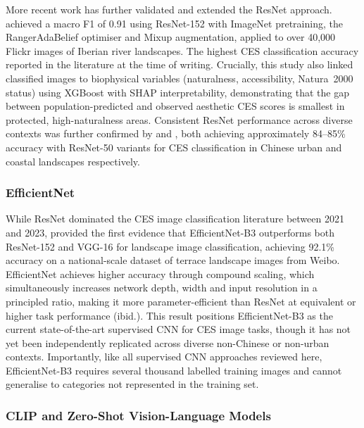 \documentclass[hidelinks, 11pt]{article}
\begin{document}
More recent work has further validated and extended the ResNet approach. \citet{comalada_modelling_2025} achieved a macro F1 of 0.91 using ResNet-152 with ImageNet pretraining, the RangerAdaBelief optimiser and Mixup augmentation, applied to over 40{,}000 Flickr images of Iberian river landscapes. The highest CES classification accuracy reported in the literature at the time of writing. Crucially, this study also linked classified images to biophysical variables (naturalness, accessibility, Natura~2000 status) using XGBoost with SHAP interpretability, demonstrating that the gap between population-predicted and observed aesthetic CES scores is smallest in protected, high-naturalness areas. Consistent ResNet performance across diverse contexts was further confirmed by \citet{you_mapping_2026} and \citet{xu_revealing_2025}, both achieving approximately 84--85\% accuracy with ResNet-50 variants for CES classification in Chinese urban and coastal landscapes respectively.

\subsubsection{EfficientNet}

While ResNet dominated the CES image classification literature between 2021 and 2023, \citet{chen_using_2025} provided the first evidence that EfficientNet-B3 \citep{tan_efficientnet_2019} outperforms both ResNet-152 and VGG-16 for landscape image classification, achieving 92.1\% accuracy on a national-scale dataset of terrace landscape images from Weibo. EfficientNet achieves higher accuracy through compound scaling, which simultaneously increases network depth, width and input resolution in a principled ratio, making it more parameter-efficient than ResNet at equivalent or higher task performance (ibid.). This result positions EfficientNet-B3 as the current state-of-the-art supervised CNN for CES image tasks, though it has not yet been independently replicated across diverse non-Chinese or non-urban contexts. Importantly, like all supervised CNN approaches reviewed here, EfficientNet-B3 requires several thousand labelled training images and cannot generalise to categories not represented in the training set.

\subsubsection{CLIP and Zero-Shot Vision-Language Models}
\end{document}
